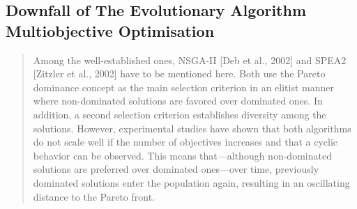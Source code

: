 \documentclass[a4paper, 11pt]{article}
\begin{document}
\subsection{Downfall of The Evolutionary Algorithm Multiobjective Optimisation}
    \begin{quote}
        Among the well-established ones, NSGA-II [Deb et al., 2002] and SPEA2 [Zitzler et al., 2002] have to be mentioned here. Both use the Pareto dominance 
        concept as the main selection criterion in an elitist manner where non-dominated solutions are favored over dominated ones. In addition, a second selection 
        criterion establishes diversity among the solutions. However, experimental studies have shown that both algorithms do not scale well if the number 
        of objectives increases and that a cyclic behavior can be observed. This means that—although non-dominated solutions are preferred over dominated 
        ones—over time, previously dominated solutions enter the population again, resulting in an oscillating distance to the Pareto front.
    \end{quote}

\newpage
\printbibliography
\end{document}

